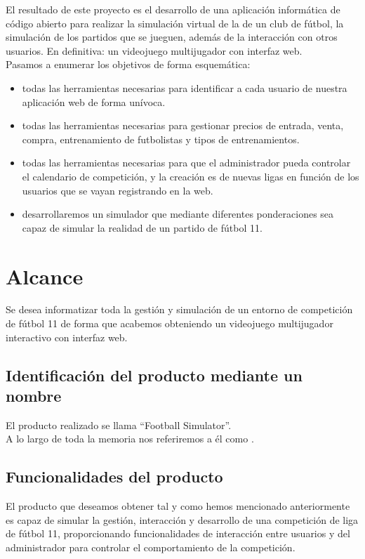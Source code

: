 El resultado de este proyecto es el desarrollo de una aplicación
informática  de código abierto para realizar la
simulación virtual de la  de un club de
fútbol, la simulación de los partidos que se jueguen, además de la
interacción con otros usuarios. En definitiva: un videojuego
multijugador con interfaz web.\\

Pasamos a enumerar los objetivos de forma esquemática:

\begin{itemize}
\item {} todas las herramientas necesarias
  para identificar a cada usuario de nuestra aplicación web de forma
  unívoca.
\item {} todas las herramientas necesarias
  para gestionar precios de entrada, venta, compra, entrenamiento de
  futbolistas y tipos de entrenamientos.
\item {} todas las herramientas
  necesarias para que el administrador pueda controlar el calendario
  de competición, y la creación es de nuevas ligas en función de los
  usuarios que se vayan registrando en la web.
\item {} desarrollaremos un simulador
  que mediante diferentes ponderaciones sea capaz de simular la
  realidad de un partido de fútbol 11.
\end{itemize}

\section{Alcance}
Se desea informatizar toda la gestión y simulación de un entorno de
competición de fútbol 11 de forma que acabemos obteniendo un
videojuego multijugador interactivo con interfaz web.

\subsection{Identificación del producto mediante un nombre}
El producto realizado se llama ``Football Simulator''.\\

A lo largo de toda la memoria nos referiremos a él como
.

\subsection{Funcionalidades del producto}
El producto que deseamos obtener tal y como hemos mencionado
anteriormente es capaz de simular la gestión, interacción y desarrollo
de una competición de liga de fútbol 11, proporcionando
funcionalidades de interacción entre usuarios y del administrador para
controlar el comportamiento de la competición.\\

